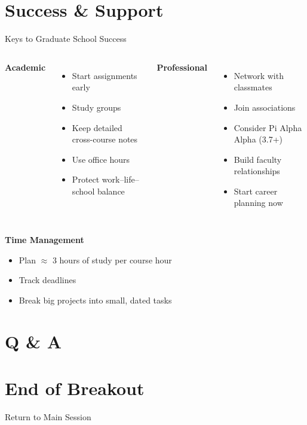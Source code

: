 \documentclass[10pt]{beamer}
\begin{document}
\section{\textcolor{titanorange}{Success \& Support}}
\begin{frame}{Keys to Graduate School Success}
\begin{columns}[T,onlytextwidth]
  \textbf{Academic}
  \begin{itemize}
    \item Start assignments early
    \item Study groups
    \item Keep detailed cross-course notes
    \item Use office hours
    \item Protect work--life--school balance
  \end{itemize}
  \textbf{Professional}
  \begin{itemize}
    \item Network with classmates
    \item Join associations
    \item Consider Pi Alpha Alpha (3.7+)
    \item Build faculty relationships
    \item Start career planning now
  \end{itemize}
\end{columns}

\vspace{0.4em}
\textbf{Time Management}
\begin{itemize}
  \item Plan \(\approx\) 3 hours of study per course hour
  \item Track deadlines
  \item Break big projects into small, dated tasks
\end{itemize}
\end{frame}

\section{\textcolor{titanorange}{Q \& A}}


\section{\textcolor{titanorange}{End of Breakout}}
\begin{frame}[standout]
\centering
\huge{Return to Main Session}
\end{frame}
\end{document}
